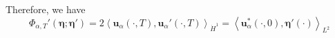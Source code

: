 \documentclass[leqno,10pt,a4paper]{amsart}
\theoremstyle{definition}
\numberwithin{equation}{section}
\newcommand{\la}{\langle}
\newcommand{\ra}{\rangle}
\newcommand{\bds}{\boldsymbol}
\def\bbeta{\boldsymbol{\eta}}
\begin{document}
%
Therefore, we have
%
\begin{equation}
\Phi_{\alpha, T}'(\bbeta; \bbeta') = 2\left\la\bds u_\alpha(\cdot, T), \bds u_\alpha'(\cdot, T)\right\ra_{\dot H^1} = \left\la\bds u_\alpha^*(\cdot, 0), \bds \eta'(\cdot)\right\ra_{L^2} 
\end{equation}
%









 
\end{document}
